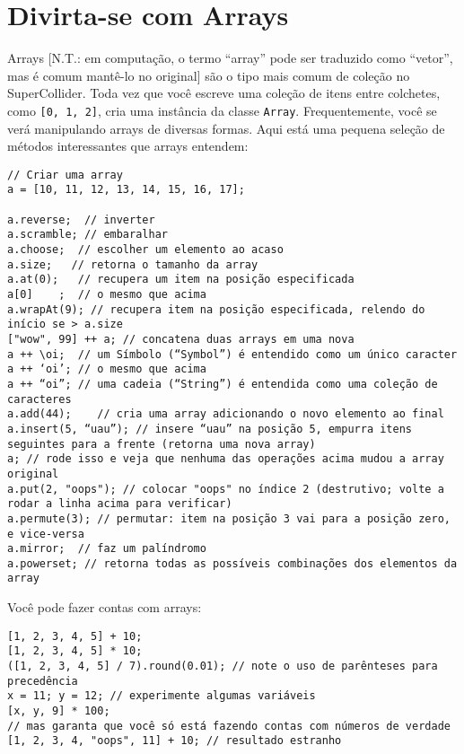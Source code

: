 \section{Divirta-se com Arrays}
\label{sec:arrays}

Arrays [N.T.: em computação, o termo “array” pode ser traduzido como “vetor”, mas é comum mantê-lo no original] são o tipo mais comum de coleção no SuperCollider. Toda vez que você escreve uma coleção de itens entre colchetes, como \texttt{[0, 1, 2]}, cria uma instância da classe \texttt{Array}. Frequentemente, você se verá manipulando arrays de diversas formas. Aqui está uma pequena seleção de métodos interessantes que arrays entendem:

 
\begin{lstlisting}[style=SuperCollider-IDE, basicstyle=\scttfamily\footnotesize]
// Criar uma array
a = [10, 11, 12, 13, 14, 15, 16, 17];

a.reverse;  // inverter
a.scramble; // embaralhar
a.choose;  // escolher um elemento ao acaso
a.size;	  // retorna o tamanho da array
a.at(0);   // recupera um item na posição especificada
a[0]	;  // o mesmo que acima
a.wrapAt(9); // recupera item na posição especificada, relendo do início se > a.size
["wow", 99] ++ a; // concatena duas arrays em uma nova
a ++ \oi;  // um Símbolo (“Symbol”) é entendido como um único caracter
a ++ ‘oi’; // o mesmo que acima
a ++ “oi”; // uma cadeia (“String”) é entendida como uma coleção de caracteres
a.add(44);    // cria uma array adicionando o novo elemento ao final
a.insert(5, “uau”); // insere “uau” na posição 5, empurra itens seguintes para a frente (retorna uma nova array)
a; // rode isso e veja que nenhuma das operações acima mudou a array original
a.put(2, "oops"); // colocar "oops" no índice 2 (destrutivo; volte a rodar a linha acima para verificar)
a.permute(3); // permutar: item na posição 3 vai para a posição zero, e vice-versa
a.mirror;  // faz um palíndromo
a.powerset; // retorna todas as possíveis combinações dos elementos da array
\end{lstlisting}
 

Você pode fazer contas com arrays:

 
\begin{lstlisting}[style=SuperCollider-IDE, basicstyle=\scttfamily\footnotesize]
[1, 2, 3, 4, 5] + 10;
[1, 2, 3, 4, 5] * 10;
([1, 2, 3, 4, 5] / 7).round(0.01); // note o uso de parênteses para precedência
x = 11; y = 12; // experimente algumas variáveis
[x, y, 9] * 100;
// mas garanta que você só está fazendo contas com números de verdade
[1, 2, 3, 4, "oops", 11] + 10; // resultado estranho
\end{lstlisting}
 


